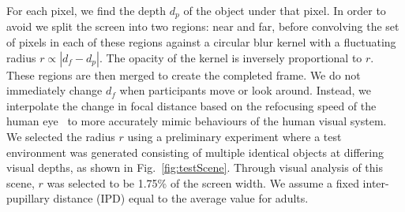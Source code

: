 For each pixel, we find the depth $d_p$ of the object under that pixel. In order to avoid  we split the screen into two regions: near and far, before convolving the set of pixels in each of these regions against a circular blur kernel with a fluctuating radius $r \propto | d_f - d_p |$. The opacity of the kernel is inversely proportional to $r$. These regions are then merged to create the completed frame. We do not immediately change $d_f$ when participants move or look around. Instead, we interpolate the change in focal distance based on the refocusing speed of the human eye~\cite{sun88} to more accurately mimic behaviours of the human visual system. We selected the radius $r$ using a preliminary experiment where a test environment was generated consisting of multiple identical objects at differing visual depths, as shown in Fig.~\ref{fig:testScene}. Through visual analysis of this scene, $r$ was selected to be 1.75\% of the screen width. We assume a fixed inter-pupillary distance (IPD) equal to the average value for adults.  \\
%
%

